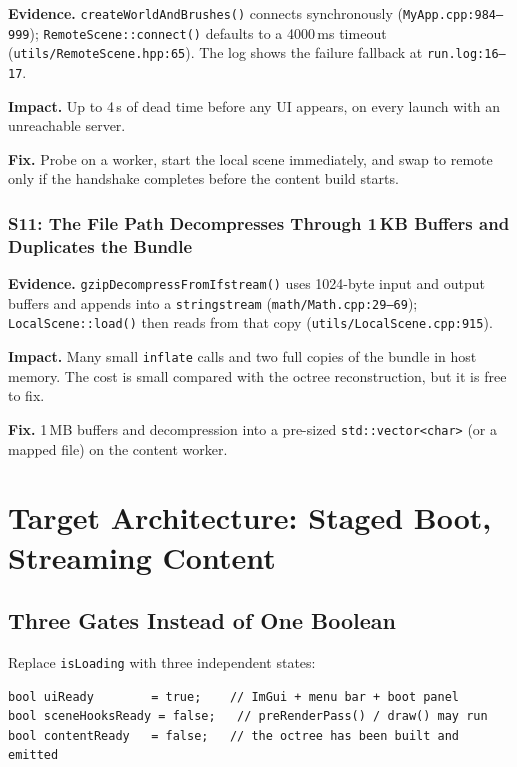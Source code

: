 \documentclass[11pt,a4paper]{article}
\begin{document}
\textbf{Evidence.} \texttt{createWorldAndBrushes()} connects synchronously
(\texttt{MyApp.cpp:984--999}); \texttt{RemoteScene::connect()} defaults to a
4000\,ms timeout (\texttt{utils/RemoteScene.hpp:65}). The log shows the
failure fallback at \texttt{run.log:16--17}.

\textbf{Impact.} Up to 4\,s of dead time before any UI appears, on every
launch with an unreachable server.

\textbf{Fix.} Probe on a worker, start the local scene immediately, and swap
to remote only if the handshake completes before the content build starts.

\subsubsection*{S11: The File Path Decompresses Through 1\,KB Buffers and
Duplicates the Bundle}

\textbf{Evidence.} \texttt{gzipDecompressFromIfstream()} uses 1024-byte input
and output buffers and appends into a \texttt{stringstream}
(\texttt{math/Math.cpp:29--69}); \texttt{LocalScene::load()} then reads from
that copy (\texttt{utils/LocalScene.cpp:915}).

\textbf{Impact.} Many small \texttt{inflate} calls and two full copies of the
bundle in host memory. The cost is small compared with the octree
reconstruction, but it is free to fix.

\textbf{Fix.} 1\,MB buffers and decompression into a pre-sized
\texttt{std::vector<char>} (or a mapped file) on the content worker.

\section{Target Architecture: Staged Boot, Streaming Content}

\subsection{Three Gates Instead of One Boolean}

Replace \texttt{isLoading} with three independent states:

\begin{lstlisting}
bool uiReady        = true;    // ImGui + menu bar + boot panel
bool sceneHooksReady = false;   // preRenderPass() / draw() may run
bool contentReady   = false;   // the octree has been built and emitted
\end{lstlisting}
\end{document}

